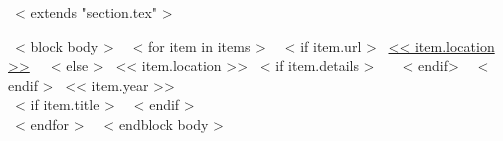~< extends "section.tex" >~

~< block body >~
  ~< for item in items >~
    ~< if item.url >~
      \href{<< item.url >>}{<< item.location >>}
      \,\, {\scriptsize
        \color{gray}{<< item.details >>}
      }
    ~< else >~
      << item.location >>
      ~< if item.details >~
      \,\, {\scriptsize
        \color{gray}{<< item.details >>}
      }
      ~< endif>~
  ~< endif >~
  \hfill << item.year >> \\
   ~< if item.title >~
   {\scriptsize
        \textit{\color{gray}{<< item.title >>}}
      } \vspace{3mm}
   ~< endif >~ \\
  ~< endfor >~
~< endblock body >~
